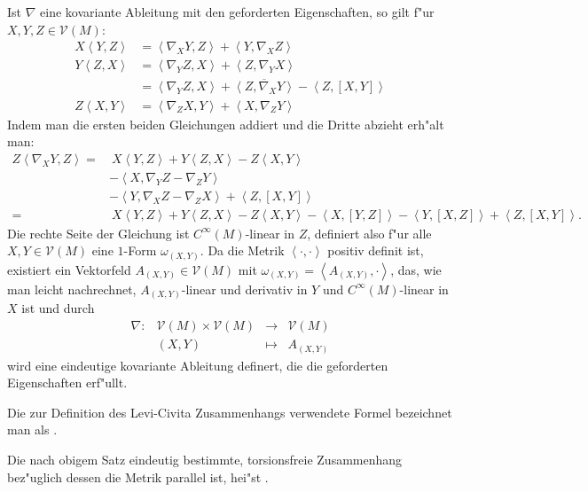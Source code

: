 \begin{bew}
  Ist $\nabla$ eine kovariante Ableitung mit den geforderten Eigenschaften, so gilt f"ur $X,Y,Z \in \mathcal V(M)$:
  \begin{align*}
    X\left<Y,Z\right> & = \left<\nabla_XY,Z\right> + \left<Y,\nabla_XZ\right>\\
    Y\left<Z,X\right> & = \left<\nabla_YZ,X\right> + \left<Z,\nabla_YX\right>\\
    & = \left<\nabla_YZ,X\right> + \overline{\left<Z,\nabla_XY\right>} - \left<Z,[X,Y]\right>\\
    Z\left<X,Y\right> & = \left<\nabla_ZX,Y \right> + \left<X,\nabla_ZY\right>
  \end{align*}
  Indem man die ersten beiden Gleichungen addiert und die Dritte abzieht erh"alt man:
  \begin{align*}
    Z\left<\nabla_XY,Z\right> = & \ X \left<Y,Z\right> + Y\left<Z,X\right> - Z\left<X,Y\right>\\
    & - \left<X,\nabla_YZ - \nabla_ZY\right> \\
    & - \left<Y,\nabla_XZ - \nabla_ZX\right> + \left<Z,[X,Y]\right>\\
    = & \ X\left<Y,Z\right> + Y\left<Z,X\right> - Z\left<X,Y\right> - \left<X,[Y,Z]\right> - \left<Y,[X,Z]\right> + \left<Z,[X,Y]\right>.
  \end{align*}
  Die rechte Seite der Gleichung ist $C^{\infty}(M)$-linear in $Z$, definiert also f"ur alle $X,Y \in \mathcal V(M)$ eine $1$-Form $\omega_{(X,Y)}$.
  Da die Metrik $\left<\cdot,\cdot\right>$ positiv definit ist, existiert ein Vektorfeld $A_{(X,Y)} \in \mathcal V(M)$ mit $\omega_{(X,Y)} = \left<A_{(X,Y)},\cdot\right>$, das, wie man leicht nachrechnet, $A_{(X,Y)}$-linear und derivativ in $Y$ und $C^{\infty}(M)$-linear in $X$ ist und durch
  \[\begin{array}{cccc}
    \nabla \colon & \mathcal V(M) \times \mathcal V(M) &\to& \mathcal V(M)\\
    &(X,Y) &\mapsto& A_{(X,Y)}
  \end{array}\]
  wird eine eindeutige kovariante Ableitung definert, die die geforderten Eigenschaften erf"ullt.
\end{bew}

\begin{bem}
  Die zur Definition des Levi-Civita Zusammenhangs verwendete Formel bezeichnet man als .
\end{bem}

\begin{Dfn}
  Die nach obigem Satz eindeutig bestimmte, torsionsfreie Zusammenhang bez"uglich dessen die Metrik parallel ist, hei"st .
\end{Dfn}

